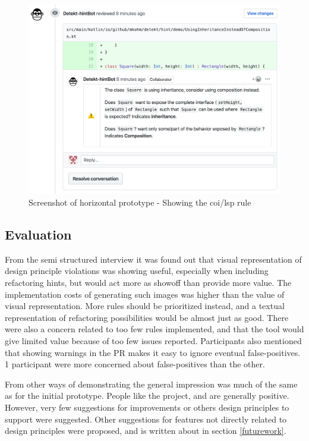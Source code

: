 \documentclass{report}
\begin{document}
\begin{figure}[h!]
    \centering
    \includegraphics[width=\textwidth]{../images/demo.png}
    \caption{Screenshot of horizontal prototype - Showing the \gls{coi}/\gls{lsp} rule}
    \label{fig:liskov}
\end{figure}


\subsection*{Evaluation}
From the semi structured interview it was found out that visual representation of design principle violations was showing useful, especially when including refactoring hints, but would act more as showoff than provide more value. The implementation costs of generating such images was higher than the value of visual representation. More rules should be prioritized instead, and a textual representation of refactoring possibilities would be almost just as good. There were also a concern related to too few rules implemented, and that the tool would give limited value because of too few issues reported. Participants also mentioned that showing warnings in the PR makes it easy to ignore eventual false-positives. 1 participant were more concerned about false-positives than the other.



From other ways of demonstrating the general impression was much of the same as for the initial prototype. People like the project, and are generally positive. However, very few suggestions for improvements or others design principles to support were suggested. Other suggestions for features not directly related to design principles were proposed, and is written about in section \ref{futurework}.
\end{document}
